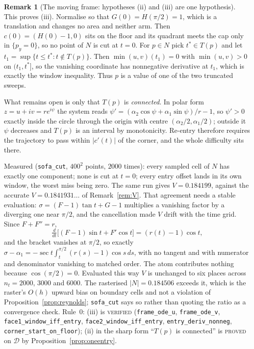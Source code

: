 \documentclass[11pt]{article}
\theoremstyle{definition}
\newtheorem{remark}[theorem]{Remark}
\begin{document}
\begin{remark}[The moving frame: hypotheses (ii) and (iii) are one hypothesis]
This proves (iii). Normalise so that $G(0)=H(\pi/2)=1$, which is a translation and changes
no area and neither arm. Then $c(0)=(H(0)-1,0)$ sits on the floor and its quadrant meets the
cap only in $\{p_y=0\}$, so no point of $N$ is cut at $t=0$. For $p\in N$ pick $t^*\in T(p)$
and let $t_1=\sup\{t\le t^*:t\notin T(p)\}$. Then $\min(u,v)(t_1)=0$ with $\min(u,v)>0$ on
$(t_1,t^*]$, so the vanishing coordinate has nonnegative derivative at $t_1$, which is exactly
the window inequality. Thus $p$ is a value of one of the two truncated sweeps.

What remains open is only that $T(p)$ is \emph{connected}. In polar form $z=u+iv=re^{i\psi}$
the system reads $\psi'=(\alpha_2\cos\psi+\alpha_1\sin\psi)/r-1$, so $\psi'>0$ exactly inside
the circle through the origin with centre $(\alpha_2/2,\alpha_1/2)$; outside it $\psi$
decreases and $T(p)$ is an interval by monotonicity. Re-entry therefore requires the
trajectory to pass within $|c'(t)|$ of the corner, and the whole difficulty sits there.

Measured (\verb|sofa_cut|, $400^2$ points, $2000$ times): every sampled cell of $N$ has
exactly one component; none is cut at $t=0$; every entry offset lands in its own window, the
worst miss being zero. The same run gives $V=0.184199$, against the accurate
$V=0.1841931\ldots$ of Remark~\ref{rem:V}. That agreement needs a stable evaluation:
$\sigma=(F-1)\tan t+G-1$ multiplies a vanishing factor by a diverging one near $\pi/2$, and
the cancellation made $V$ drift with the time grid. Since $F+F''=r$,
\[
  \tfrac{d}{dt}\bigl[(F-1)\sin t+F'\cos t\bigr]=(r(t)-1)\cos t ,
\]
and the bracket vanishes at $\pi/2$, so exactly
$\sigma-\alpha_1=-\sec t\int_t^{\pi/2}(r(s)-1)\cos s\,ds$, with no tangent and with numerator
and denominator vanishing to matched order. The atom contributes nothing because
$\cos(\pi/2)=0$. Evaluated this way $V$ is unchanged to six places across $n_t=2000$, $3000$
and $6000$. The rasterised $|N|=0.184506$ exceeds it, which is the raster's $O(h)$ upward
bias on boundary cells and not a violation of Proposition~\ref{prop:reynolds};
\verb|sofa_cut| says so rather than quoting the ratio as a convergence check. Rule~0: (iii) is \textsc{verified}
(\verb|frame_ode_u|, \verb|frame_ode_v|, \verb|face1_window_iff_entry|,
\verb|face2_window_iff_entry|, \verb|entry_deriv_nonneg|, \verb|corner_start_on_floor|);
(ii) in the sharp form ``$T(p)$ is connected'' is \textsc{proved} on $\mathcal D$ by
Proposition~\ref{prop:oneentry}.
\end{remark}
\end{document}
